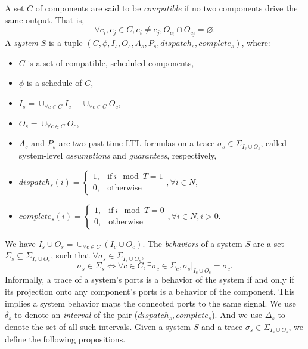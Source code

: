 A set $C$ of components are said to be \emph{compatible} if no two components drive the same output. That is,
\begin{equation*}
	\forall c_i,c_j \in C, c_i\neq c_j, O_{c_i} \cap O_{c_j} = \varnothing.
\end{equation*}
A \emph{system} $S$ is a tuple $(C, \phi, I_s, O_s, A_s, P_s, dispatch_s, complete_s)$, where:
\begin{itemize}
	\item $C$ is a set of compatible, scheduled components,
	\item $\phi$ is a schedule of $C$,	
	\item $I_s = \cup_{\forall c \in C}I_c -  \cup_{\forall c \in C}O_c$,
	\item $O_s = \cup_{\forall c \in C}O_c$,
	\item $A_s$ and $P_s$ are two past-time LTL formulas on a trace $\sigma_s \in \Sigma_{I_s \cup O_s}$, called system-level \emph{assumptions} and \emph{guarantees}, respectively,
	\item $dispatch_s (i) = 
	    	\begin{cases}
      		1, & \text{if}\ i \mod T =1 \\
	     	0, & \text{otherwise}
   	 	\end{cases}, \forall i \in N$,
   	\item $complete_s (i) =
   		\begin{cases}
      		1, & \text{if}\ i \mod T = 0 \\
	     	0, & \text{otherwise}
   	 	\end{cases}, \forall i \in N, i > 0$.
\end{itemize}
We have $I_s  \cup O_s = \cup_{\forall c \in C}(I_c \cup O_c)$.
The \emph{behaviors} of a system $S$ are a set $\Sigma_s \subseteq \Sigma_{I_s \cup O_s}$, such that $\forall \sigma_s \in \Sigma_{I_s \cup O_s}$, 
\begin{equation*}
	\sigma_s\in \Sigma_s  \iff \forall c \in C, \exists \sigma_c \in \Sigma_c, \sigma_s|_{I_c \cup O_c} = \sigma_c.
\end{equation*}
Informally, a trace of a system's ports is a behavior of the system if and only if its projection onto any component's ports is a behavior of the component. 
This implies a system behavior maps the connected ports to the same signal.
We use $\delta_s$ to denote an \emph{interval} of the pair ($dispatch_s, complete_s$). And we use $\Delta_s$ to denote the set of all such intervals.
Given a system $S$ and a trace $\sigma_s \in \Sigma_{I_s \cup O_s}$, we define the following propositions.

